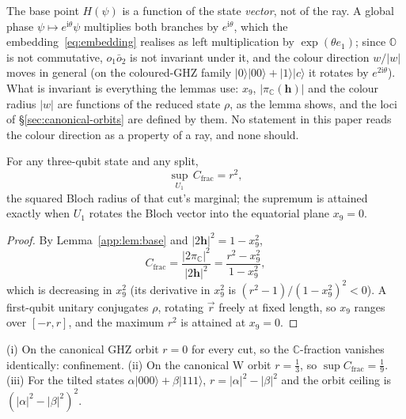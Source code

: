 \begin{remark}
The base point $H(\psi)$ is a function of the state \emph{vector}, not of the ray. A global phase
$\psi\mapsto e^{\mathrm{i}\theta}\psi$ multiplies both branches by $e^{\mathrm{i}\theta}$, which the
embedding~\eqref{eq:embedding} realises as left multiplication by $\exp(\theta e_1)$; since
$\mathbb{O}$ is not commutative, $o_1\bar o_2$ is not invariant under it, and the colour direction
$w/\lvert w\rvert$ moves in general (on the coloured-GHZ family $\lvert 0\rangle\lvert 00\rangle +
\lvert 1\rangle\lvert c\rangle$ it rotates by $e^{2\mathrm{i}\theta}$). What is invariant is
everything the lemmas use: $x_9$, $\lvert\pi_{\mathbb{C}}(\mathbf{h})\rvert$ and the colour radius
$\lvert w\rvert$ are functions of the reduced state $\rho$, as the lemma shows, and the loci of
\S\ref{sec:canonical-orbits} are defined by them. No statement in this paper reads the colour
direction as a property of a ray, and none should.
\end{remark}

\begin{lemma}\label{app:lem:ceiling}
For any three-qubit state and any split,
\begin{equation}
  \sup_{U_1}\,C_{\mathrm{frac}} = r^2,
\end{equation}
the squared Bloch radius of that cut's marginal; the supremum is attained exactly when $U_1$ rotates
the Bloch vector into the equatorial plane $x_9 = 0$.
\end{lemma}

\begin{proof}
By Lemma~\ref{app:lem:base} and $|2\mathbf{h}|^2 = 1-x_9^2$,
\begin{equation}
  C_{\mathrm{frac}} = \frac{|2\pi_{\mathbb{C}}|^2}{|2\mathbf{h}|^2}
  = \frac{r^2 - x_9^2}{1 - x_9^2},
\end{equation}
which is decreasing in $x_9^2$ (its derivative in $x_9^2$ is $(r^2-1)/(1-x_9^2)^2 < 0$). A
first-qubit unitary conjugates $\rho$, rotating $\vec r$ freely at fixed length, so $x_9$ ranges over
$[-r,r]$, and the maximum $r^2$ is attained at $x_9 = 0$.
\end{proof}

\begin{corollary}[Instances]\label{app:cor:instances}
(i) On the canonical GHZ orbit $r = 0$ for every cut, so the $\mathbb{C}$-fraction vanishes
identically: confinement. (ii) On the canonical W orbit $r = \tfrac13$, so
$\sup C_{\mathrm{frac}} = \tfrac19$. (iii) For the tilted states
$\alpha\lvert000\rangle+\beta\lvert111\rangle$, $r = |\alpha|^2-|\beta|^2$ and the orbit ceiling is
$(|\alpha|^2-|\beta|^2)^2$.
\end{corollary}

